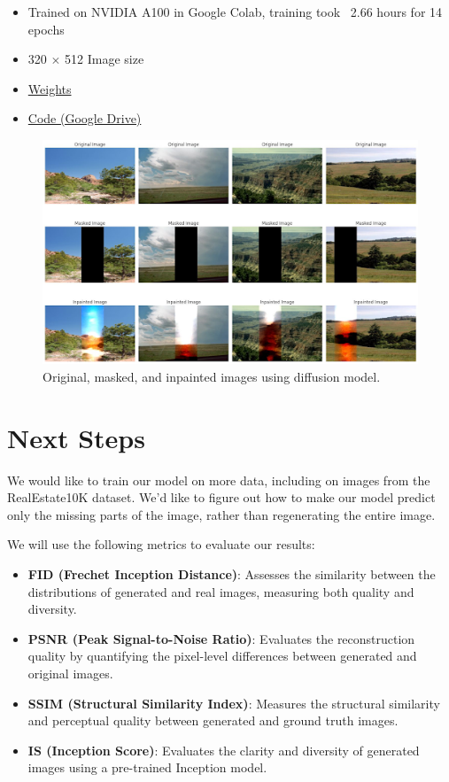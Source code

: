 \documentclass[sigconf]{acmart}
\begin{document}
\begin{itemize}
    \item Trained on NVIDIA A100 in Google Colab, training took ~2.66 hours for 14 epochs
    \item 320 $\times$ 512 Image size
    \item \textcolor{red}{\href{https://drive.google.com/file/d/1-wr7a01nVmRRFrYpwbjaQlc0FIDKINvY/view?usp=sharing}{Weights}}
    \item \textcolor{red}{\href{https://colab.research.google.com/drive/1XZfe98Ox-r8rhJx-8WGiJiJjFm-hb6yO?authuser=2}{Code (Google Drive)}}
\end{itemize}

\begin{figure}[h]
    \centering
    \includegraphics[width=0.8\linewidth]{diffusion_results.png}
    \caption{Original, masked, and inpainted images using diffusion model.}
\end{figure}

\section*{Next Steps}
We would like to train our model on more data, including on images from the RealEstate10K dataset. We’d like to figure out how to make our model predict only the missing parts of the image, rather than regenerating the entire image.

We will use the following metrics to evaluate our results:
\begin{itemize}
    \item \textbf{FID (Frechet Inception Distance)}: Assesses the similarity between the distributions of generated and real images, measuring both quality and diversity.
    \item \textbf{PSNR (Peak Signal-to-Noise Ratio)}: Evaluates the reconstruction quality by quantifying the pixel-level differences between generated and original images.
    \item \textbf{SSIM (Structural Similarity Index)}: Measures the structural similarity and perceptual quality between generated and ground truth images.
    \item \textbf{IS (Inception Score)}: Evaluates the clarity and diversity of generated images using a pre-trained Inception model.
\end{itemize}
\end{document}
